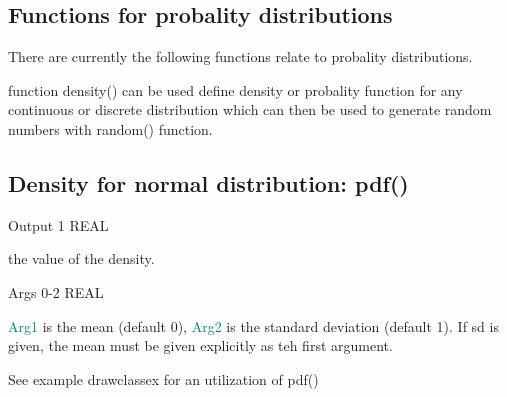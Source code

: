 \begin{itemize}
\section{Functions for probality distributions}
\label{dist}
There are currently the following functions relate to probality distributions.
\begin{note}
function \textcolor{VioletRed}{density}() can be used define density or probality
function for any continuous or discrete distribution which can then be used
to generate random numbers with \textcolor{VioletRed}{random}() function.
\end{note}
\subsection{Density for normal distribution: \textcolor{VioletRed}{pdf}()}
\label{pdf}
\vspace{0.3cm}
\hline
\vspace{0.3cm}
\noindent Output  \tabto{3cm}  1  \tabto{5cm}   REAL  \tabto{7cm}
\begin{changemargin}{3cm}{0cm}
\noindent  the value of the density.
\end{changemargin}
\vspace{0.3cm}
\hline
\vspace{0.3cm}
\noindent Args  \tabto{3cm} 0-2  \tabto{5cm}   REAL  \tabto{7cm}
\begin{changemargin}{3cm}{0cm}
\noindent  \textcolor{teal}{Arg1} is the mean (default 0), \textcolor{teal}{Arg2} is the standard deviation
(default 1). If sd is given, the mean must be given explicitly as teh first argument.
\end {changemargin}
\hline
\vspace{0.2cm}
\begin{note}
See example drawclassex for an utilization of \textcolor{VioletRed}{pdf}()
\end{note}

\end{itemize}
